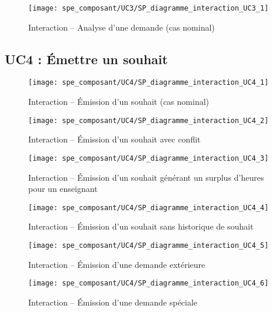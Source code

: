     \begin{figure}[h]
    	\centering
    	\texttt{[image: spe\_composant/UC3/SP\_diagramme\_interaction\_UC3\_1]}
    	\caption{Interaction \--- Analyse d'une demande (cas nominal)}
    	\label{fig:label}
    \end{figure}

    \FloatBarrier
    \subsection{UC4 : \'Emettre un souhait}
    
    \begin{figure}[h]
    	\centering
    	\texttt{[image: spe\_composant/UC4/SP\_diagramme\_interaction\_UC4\_1]}
    	\caption{Interaction \--- Émission d'un souhait (cas nominal)}
    	\label{fig:label}
    \end{figure}
    
    \begin{figure}[h]
    	\centering
    	\texttt{[image: spe\_composant/UC4/SP\_diagramme\_interaction\_UC4\_2]}
    	\caption{Interaction \--- Émission d'un souhait avec conflit}
    	\label{fig:label}
    \end{figure}
    
    \begin{figure}[h]
    	\centering
    	\texttt{[image: spe\_composant/UC4/SP\_diagramme\_interaction\_UC4\_3]}
    	\caption{Interaction \--- Émission d'un souhait générant un surplus d'heures pour un enseignant}
    	\label{fig:label}
    \end{figure}
    
    \begin{figure}[h]
    	\centering
    	\texttt{[image: spe\_composant/UC4/SP\_diagramme\_interaction\_UC4\_4]}
    	\caption{Interaction \--- Émission d'un souhait sans historique de souhait}
    	\label{fig:label}
    \end{figure}
    
    \begin{figure}[h]
    	\centering
    	\texttt{[image: spe\_composant/UC4/SP\_diagramme\_interaction\_UC4\_5]}
    	\caption{Interaction \--- Émission d'une demande extérieure}
    	\label{fig:label}
    \end{figure}
    
    \begin{figure}[h]
    	\centering
    	\texttt{[image: spe\_composant/UC4/SP\_diagramme\_interaction\_UC4\_6]}
    	\caption{Interaction \--- Émission d'une demande spéciale}
    	\label{fig:label}
    \end{figure}
    
